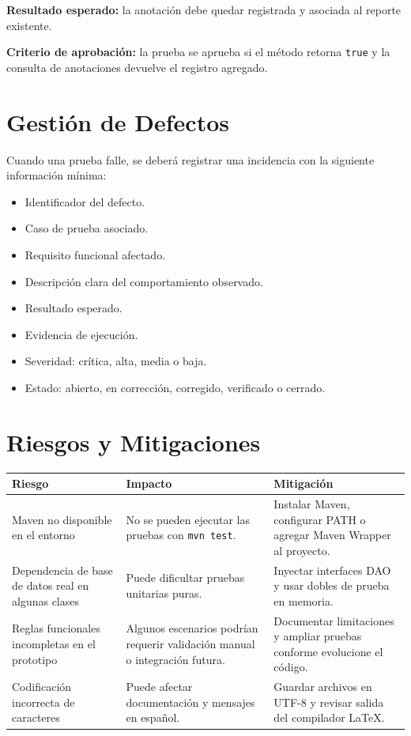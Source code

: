 \documentclass[12pt,a4paper]{article}
\begin{document}
\textbf{Resultado esperado:} la anotación debe quedar registrada y asociada al reporte existente.

\textbf{Criterio de aprobación:} la prueba se aprueba si el método retorna \texttt{true} y la consulta de anotaciones devuelve el registro agregado.

\section{Gestión de Defectos}

Cuando una prueba falle, se deberá registrar una incidencia con la siguiente información mínima:

\begin{itemize}[leftmargin=*]
    \item Identificador del defecto.
    \item Caso de prueba asociado.
    \item Requisito funcional afectado.
    \item Descripción clara del comportamiento observado.
    \item Resultado esperado.
    \item Evidencia de ejecución.
    \item Severidad: crítica, alta, media o baja.
    \item Estado: abierto, en corrección, corregido, verificado o cerrado.
\end{itemize}

\section{Riesgos y Mitigaciones}

\begin{longtable}{|p{4.5cm}|p{5cm}|p{4.5cm}|}
\hline
\rowcolor{grisClaro}
\textbf{Riesgo} & \textbf{Impacto} & \textbf{Mitigación} \\
\hline
Maven no disponible en el entorno & No se pueden ejecutar las pruebas con \texttt{mvn test}. & Instalar Maven, configurar PATH o agregar Maven Wrapper al proyecto. \\
\hline
Dependencia de base de datos real en algunas clases & Puede dificultar pruebas unitarias puras. & Inyectar interfaces DAO y usar dobles de prueba en memoria. \\
\hline
Reglas funcionales incompletas en el prototipo & Algunos escenarios podrían requerir validación manual o integración futura. & Documentar limitaciones y ampliar pruebas conforme evolucione el código. \\
\hline
Codificación incorrecta de caracteres & Puede afectar documentación y mensajes en español. & Guardar archivos en UTF-8 y revisar salida del compilador LaTeX. \\
\hline
\end{longtable}
\end{document}
